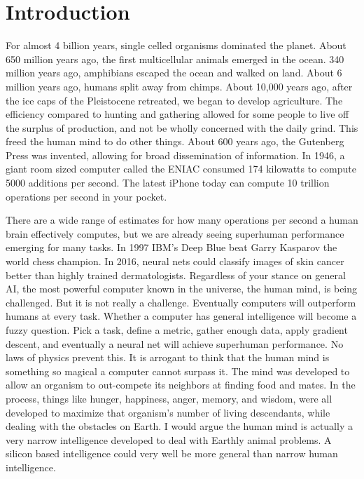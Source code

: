 \chapter{Introduction}
For almost 4 billion years, single celled organisms dominated the planet.  About 650 million years ago, the first multicellular animals emerged in the ocean.  340 million years ago, amphibians escaped the ocean and walked on land.  About 6 million years ago, humans split away from chimps.  About 10,000 years ago, after the ice caps of the Pleistocene retreated, we began to develop agriculture.  The efficiency compared to hunting and gathering allowed for some people to live off the surplus of production, and not be wholly concerned with the daily grind.  This freed the human mind to do other things.  About 600 years ago, the Gutenberg Press was invented, allowing for broad dissemination of information.  In 1946, a giant room sized computer called the ENIAC consumed 174 kilowatts to compute 5000 additions per second.  The latest iPhone today can compute 10 trillion operations per second in your pocket.  

There are a wide range of estimates for how many operations per second a human brain effectively computes, but we are already seeing superhuman performance emerging for many tasks.  In 1997 IBM's Deep Blue beat Garry Kasparov the world chess champion.  In 2016, neural nets could classify images of skin cancer better than highly trained dermatologists.  Regardless of your stance on general AI, the most powerful computer known in the universe, the human mind, is being challenged.  But it is not really a challenge.  Eventually computers will outperform humans at every task.  Whether a computer has general intelligence will become a fuzzy question.  Pick a task, define a metric, gather enough data, apply gradient descent, and eventually a neural net will achieve superhuman performance.  No laws of physics prevent this.  It is arrogant to think that the human mind is something so magical a computer cannot surpass it.  The mind was developed to allow an organism to out-compete its neighbors at finding food and mates.  In the process, things like hunger, happiness, anger, memory, and wisdom, were all developed to maximize that organism's number of living descendants, while dealing with the obstacles on Earth.  I would argue the human mind is actually a very narrow intelligence developed to deal with Earthly animal problems.  A silicon based intelligence could very well be more general than narrow human intelligence.

